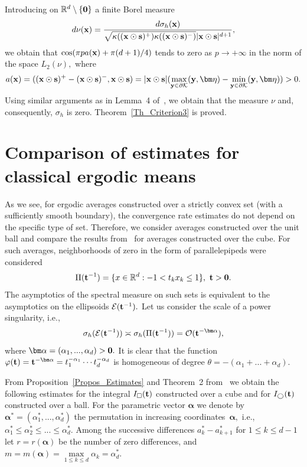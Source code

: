 \documentclass[12pt]{article}
\begin{document}
Introducing on ${\mathbb{R}^d\setminus\{{\bf0}\}}$ a finite Borel measure 
$$
d\nu({\bf x})=\frac{d\sigma_h({\bf{x}})}{\sqrt{\kappa(({\bf x}\odot{\bf s})^+)\kappa(({\bf x}\odot{\bf s})^-)}|{\bf x}\odot{\bf s}|^{d+1}},
$$ 
we obtain that ${\cos(\pi pa({\bf x})+\pi(d+1)/4)}$ tends to zero as ${p\to+\infty}$ in the norm of the space ${L_2(\nu)},$  
where
$$
a({\bf x})=(({\bf x}\odot{\bf s})^+-({\bf x}\odot{\bf s})^-,{\bf x}\odot{\bf s})=|{\bf x}\odot{\bf s}|(\max_{{\bf y}\in\partial\mathcal{K}}({\bf y},\bm\eta)-\min_{{\bf y}\in\partial\mathcal{K}}({\bf y},\bm\eta))>0.
$$
Using similar arguments as in Lemma~4 of~\cite{KPT23}, we obtain that the measure $\nu$ and, consequently, $\sigma_h$ is zero. Theorem~\ref{Th_Criterion3} is proved.

\section{Comparison of estimates for classical ergodic means}

As we see, for ergodic averages constructed over a strictly convex set (with a sufficiently smooth boundary), the convergence rate estimates do not depend on the specific type of set. Therefore, we consider averages constructed over the unit ball and compare the results from~\cite{Po24} for averages constructed over the cube. For such averages, neighborhoods of zero in the form of parallelepipeds were considered
$$
\Pi({\bf t}^{-1})=\{x\in\mathbb{R}^d: -1<t_kx_k\leq1\}, \ {\bf t}>\bf0.
$$
The asymptotics of the spectral measure on such sets is equivalent to the asymptotics on the ellipsoids $\mathcal{E}({\bf t}^{-1}).$ Let us consider the scale of a power singularity, i.e.,
\begin{equation}\label{eq_PowerEstimate}
\sigma_h(\mathcal{E}({\bf t}^{-1}))\asymp\sigma_h(\Pi({\bf t}^{-1}))=\mathcal{O}({\bf t}^{-\bm \alpha}),
\end{equation}
where ${\bm\alpha=(\alpha_1,...,\alpha_d)>\bf 0}.$ It is clear that the function $\varphi({\bf t})={\bf t}^{-\bm \alpha}=t_1^{-\alpha_1}\cdots t_d^{-\alpha_d}$ is homogeneous of degree ${\theta=-(\alpha_1+...+\alpha_d)}.$

From Proposition~\ref{Propos_Estimates} and Theorem~2 from~\cite{Po24} we obtain the following estimates for the integral
$I_\square({\bf t})$ constructed over a cube and for $I_\bigcirc({\bf t})$ constructed over a ball.
For the parametric vector $\bm{\alpha}$ we denote by $\bm{\alpha}^*=(\alpha^*_1,...,\alpha^*_d)$ the permutation in increasing coordinates~$\bm{\alpha},$ i.e., ${\alpha^*_1\leq\alpha^*_2\leq ... \leq\alpha^*_d}.$
Among the successive differences ${a^*_k-a^*_{k+1}}$ for ${1\leq k \leq d-1}$
let $r=r(\bm{\alpha})$ be the number of zero differences, and
${m=m(\bm{\alpha})=\max\limits_{1\leq k\leq d}\alpha_k=\alpha^*_d}.$
\end{document}
